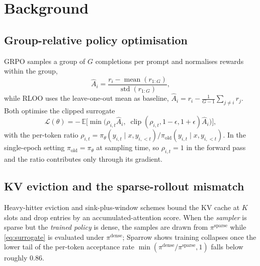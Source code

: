\section{Background}
\label{sec:background}

\subsection{Group-relative policy optimisation}
\label{sec:grpo}


GRPO \citep{shao2024grpo} samples a group of $G$ completions per prompt and
normalises rewards within the group,
\begin{equation}
  \hat A_i = \frac{r_i - \operatorname{mean}(r_{1:G})}{\operatorname{std}(r_{1:G})},
\end{equation}
while RLOO \citep{ahmadian2024rloo} uses the leave-one-out mean as baseline,
$\hat A_i = r_i - \tfrac{1}{G-1}\sum_{j\neq i} r_j$. Both optimise the clipped
surrogate
\begin{equation}
  \mathcal{L}(\theta) = -\,\mathbb{E}\Big[\min\big(\rho_{i,t}\hat A_i,\;
    \operatorname{clip}(\rho_{i,t},1-\epsilon,1+\epsilon)\hat A_i\big)\Big],
  \label{eq:surrogate}
\end{equation}
with the per-token ratio
$\rho_{i,t} = \pi_\theta(y_{i,t}\mid x, y_{i,<t}) / \pi_{\text{old}}(y_{i,t}\mid x, y_{i,<t})$.
In the single-epoch setting $\pi_{\text{old}}=\pi_\theta$ at sampling time,
so $\rho_{i,t}=1$ in the forward pass and the ratio contributes only through
its gradient. 

\subsection{KV eviction and the sparse-rollout mismatch}
\label{sec:eviction}

Heavy-hitter eviction \citep{zhang2023h2o} and sink-plus-window schemes
\citep{xiao2024streamingllm} bound the KV cache at $K$ slots and drop entries
by an accumulated-attention score. When the \emph{sampler} is sparse but the
\emph{trained policy} is dense, the samples are drawn from
$\pi^{\text{sparse}}$ while \cref{eq:surrogate} is evaluated under
$\pi^{\text{dense}}$; Sparrow \citep{sadhukhan2026sparrow} shows training
collapses once the lower tail of the per-token acceptance rate
$\min(\pi^{\text{dense}}/\pi^{\text{sparse}},1)$ falls below roughly $0.86$.
